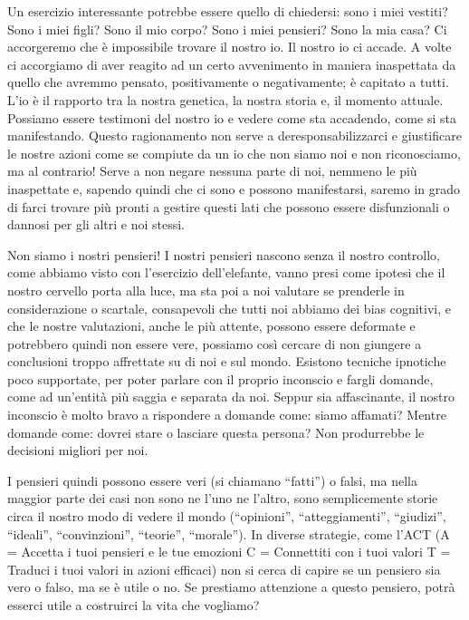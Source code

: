 \documentclass[12pt]{book} %
\begin{document}
Un esercizio interessante potrebbe essere quello di
chiedersi: sono i miei vestiti? Sono i miei figli? Sono il mio corpo? Sono i miei pensieri? Sono la mia casa? Ci
accorgeremo che è impossibile trovare il nostro io. Il nostro io ci accade. A volte ci accorgiamo di aver reagito ad un
certo avvenimento in maniera inaspettata da quello che avremmo pensato, positivamente o negativamente; è capitato a
tutti. L'io è il rapporto tra la nostra genetica, la nostra storia e, il momento attuale. Possiamo
essere testimoni del nostro io e vedere come sta accadendo, come si sta manifestando. Questo ragionamento non serve a
deresponsabilizzarci e giustificare le nostre azioni come se compiute da un io che non siamo noi e non riconosciamo, ma
al contrario! Serve a non negare nessuna parte di noi, nemmeno le più inaspettate e, sapendo quindi che ci sono e
possono manifestarsi, saremo in grado di farci trovare più pronti a gestire questi lati che possono essere
disfunzionali o dannosi per gli altri e noi stessi.

Non siamo i nostri pensieri! I nostri pensieri nascono senza il nostro controllo, come abbiamo visto con
l'esercizio dell'elefante, vanno presi come ipotesi che il nostro cervello
porta alla luce, ma sta poi a noi valutare se prenderle in considerazione o scartale, consapevoli che tutti noi
abbiamo dei bias cognitivi, e che le nostre valutazioni, anche le più attente, possono essere deformate e potrebbero quindi non
essere vere, possiamo così cercare di non giungere a conclusioni troppo affrettate su di noi e sul mondo. Esistono tecniche
ipnotiche poco supportate, per poter parlare con il proprio inconscio e fargli domande, come ad un'entità più saggia e separata da noi.
Seppur sia affascinante, il nostro inconscio è molto bravo a rispondere a domande come: siamo affamati? Mentre domande
come: dovrei stare o lasciare questa persona? Non produrrebbe le decisioni migliori per noi. 

I pensieri quindi possono essere veri (si chiamano “fatti”) o falsi, ma nella maggior parte dei casi non sono ne
l'uno ne l'altro, sono semplicemente storie circa il nostro modo di vedere il
mondo (“opinioni”, “atteggiamenti”, “giudizi”, “ideali”, “convinzioni”, “teorie”, “morale”). In diverse strategie, come
l'ACT (A = Accetta i tuoi pensieri e le tue emozioni C = Connettiti con i tuoi valori T = Traduci
i tuoi valori in azioni efficaci) non si cerca di capire se un pensiero sia vero o falso, ma se è utile o no. Se
prestiamo attenzione a questo pensiero, potrà esserci utile a costruirci la vita che vogliamo?
\end{document}
